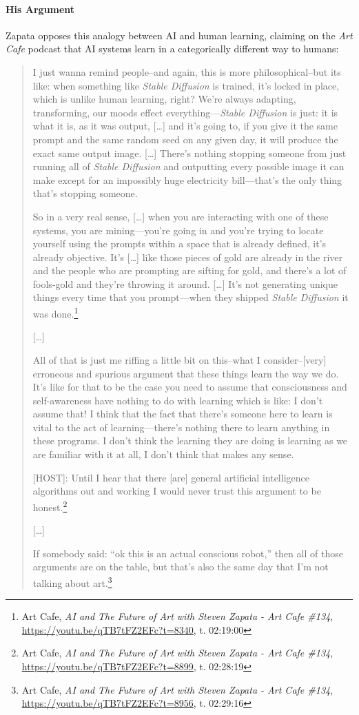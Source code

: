 \documentclass[11pt]{article}
\begin{document}
\paragraph*{His Argument}
\label{sec:orgea21174}
Zapata opposes this analogy between AI and human learning, claiming on the \emph{Art Cafe} podcast that AI systems learn in a categorically different way to humans:
\begin{quote}
I just wanna remind people--and again, this is more philosophical--but its like: when something like \emph{Stable Diffusion} is trained, it's locked in place, which is unlike human learning, right? We're always adapting, transforming, our moods effect everything---\emph{Stable Diffusion} is just: it is what it is, as it was output, [\ldots{}] and it's going to, if you give it the same prompt and the same random seed on any given day, it will produce the exact same output image. [\ldots{}] There's nothing stopping someone from just running all of \emph{Stable Diffusion} and outputting every possible image it can make except for an impossibly huge electricity bill---that's the only thing that's stopping someone.

So in a very real sense, [\ldots{}] when you are interacting with one of these systems, you are mining---you're going in and you're trying to locate yourself using the prompts within a space that is already defined, it's already objective. It's [\ldots{}] like those pieces of gold are already in the river and the people who are prompting are sifting for gold, and there's a lot of fools-gold and they're throwing it around. [\ldots{}]  It's not generating unique things every time that you prompt---when they shipped \emph{Stable Diffusion} it was done.\footnote{Art Cafe, \emph{AI and The Future of Art with Steven Zapata - Art Cafe \#134}, \url{https://youtu.be/qTB7tFZ2EFc?t=8340}, t. 02:19:00}

[\ldots{}]

All of that is just me riffing a little bit on this--what I consider--[very] erroneous and spurious argument that these things learn the way we do. It's like for that to be the case you need to assume that consciousness and self-awareness have nothing to do with learning which is like: I don't assume that! I think that the fact that there's someone here to learn is vital to the act of learning---there's nothing there to learn anything in these programs. I don't think the learning they are doing is learning as we are familiar with it at all, I don't think that makes any sense.

[HOST]: Until I hear that there [are] general artificial intelligence algorithms out and working I would never trust this argument to be honest.\footnote{Art Cafe, \emph{AI and The Future of Art with Steven Zapata - Art Cafe \#134}, \url{https://youtu.be/qTB7tFZ2EFc?t=8899}, t. 02:28:19}

[\ldots{}]

If somebody said: ``ok this is an actual conscious robot,'' then all of those arguments are on the table, but that's also the same day that I'm not talking about art.\footnote{Art Cafe, \emph{AI and The Future of Art with Steven Zapata - Art Cafe \#134}, \url{https://youtu.be/qTB7tFZ2EFc?t=8956}, t. 02:29:16}
\end{quote}
\end{document}
